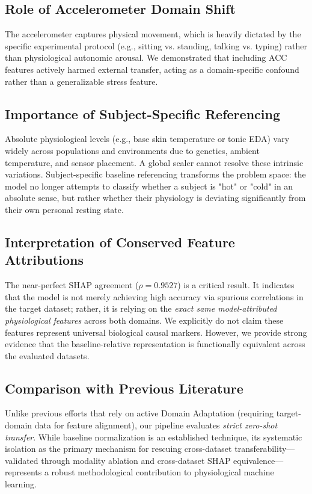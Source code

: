 \documentclass[journal]{IEEEtran}
\begin{document}
\subsection{Role of Accelerometer Domain Shift}
The accelerometer captures physical movement, which is heavily dictated by the specific experimental protocol (e.g., sitting vs. standing, talking vs. typing) rather than physiological autonomic arousal. We demonstrated that including ACC features actively harmed external transfer, acting as a domain-specific confound rather than a generalizable stress feature.

\subsection{Importance of Subject-Specific Referencing}
Absolute physiological levels (e.g., base skin temperature or tonic EDA) vary widely across populations and environments due to genetics, ambient temperature, and sensor placement. A global scaler cannot resolve these intrinsic variations. Subject-specific baseline referencing transforms the problem space: the model no longer attempts to classify whether a subject is "hot" or "cold" in an absolute sense, but rather whether their physiology is deviating significantly from their own personal resting state. 

\subsection{Interpretation of Conserved Feature Attributions}
The near-perfect SHAP agreement ($\rho = 0.9527$) is a critical result. It indicates that the model is not merely achieving high accuracy via spurious correlations in the target dataset; rather, it is relying on the \textit{exact same model-attributed physiological features} across both domains. We explicitly do not claim these features represent universal biological causal markers. However, we provide strong evidence that the baseline-relative representation is functionally equivalent across the evaluated datasets.

\subsection{Comparison with Previous Literature}
Unlike previous efforts that rely on active Domain Adaptation (requiring target-domain data for feature alignment), our pipeline evaluates \textit{strict zero-shot transfer}. While baseline normalization is an established technique, its systematic isolation as the primary mechanism for rescuing cross-dataset transferability—validated through modality ablation and cross-dataset SHAP equivalence—represents a robust methodological contribution to physiological machine learning.
\end{document}
